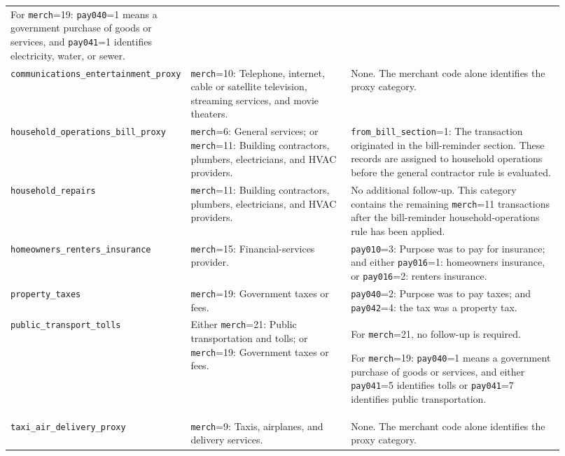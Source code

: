 \documentclass[11pt]{article}
\newcommand{\code}[1]{\nolinkurl{#1}}
\begin{document}
\begin{landscape}
\begin{longtable}{
			>{\RaggedRight\arraybackslash}p{0.20\linewidth}
			>{\RaggedRight\arraybackslash}p{0.31\linewidth}
			>{\RaggedRight\arraybackslash}p{0.41\linewidth}
		}
		For \code{merch}=19:
		\code{pay040}=1 means a government purchase of goods or services, and
		\code{pay041}=1 identifies electricity, water, or sewer. \\
		
		\code{communications_entertainment_proxy} &
		\code{merch}=10: Telephone, internet, cable or satellite television,
		streaming services, and movie theaters. &
		None. The merchant code alone identifies the proxy category. \\
		
		\code{household_operations_bill_proxy} &
		\code{merch}=6: General services; or
		\code{merch}=11: Building contractors, plumbers, electricians, and
		HVAC providers. &
		\code{from_bill_section}=1: The transaction originated in the
		bill-reminder section. These records are assigned to household operations
		before the general contractor rule is evaluated. \\
		
		\code{household_repairs} &
		\code{merch}=11: Building contractors, plumbers, electricians, and
		HVAC providers. &
		No additional follow-up. This category contains the remaining
		\code{merch}=11 transactions after the bill-reminder household-operations
		rule has been applied. \\
		
		\code{homeowners_renters_insurance} &
		\code{merch}=15: Financial-services provider. &
		\code{pay010}=3: Purpose was to pay for insurance; and either
		\code{pay016}=1: homeowners insurance, or
		\code{pay016}=2: renters insurance. \\
		
		\code{property_taxes} &
		\code{merch}=19: Government taxes or fees. &
		\code{pay040}=2: Purpose was to pay taxes; and
		\code{pay042}=4: the tax was a property tax. \\
		
		\code{public_transport_tolls} &
		Either \code{merch}=21: Public transportation and tolls; or
		\code{merch}=19: Government taxes or fees. &
		For \code{merch}=21, no follow-up is required.
		
		For \code{merch}=19:
		\code{pay040}=1 means a government purchase of goods or services, and
		either \code{pay041}=5 identifies tolls or
		\code{pay041}=7 identifies public transportation. \\
		
		\code{taxi_air_delivery_proxy} &
		\code{merch}=9: Taxis, airplanes, and delivery services. &
		None. The merchant code alone identifies the proxy category. \\
		

\end{longtable}
\end{landscape}
\end{document}
